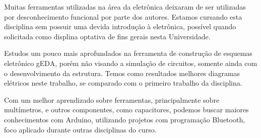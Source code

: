 \documentclass{article}
\begin{document}
Muitas ferramentas utilizadas na área da eletrônica deixaram de ser utilizadas
por desconhecimento funcional por parte dos autores. Estamos cursando esta
disciplina sem possuir uma devida introdução à eletrônica, possível quando
solicitada como displina optativa de fins gerais nesta Universidade.

Estudos um pouco mais aprofundados na ferramenta de construção de esquemas
eletrônico gEDA, porém não visando a simulação de circuitos, somente ainda com o
desenvolvimento da estrutura. Temos como resultados melhores diagramas elétricos
neste trabalho, se comparado com o primeiro trabalho da disciplina.

Com um melhor aprendizado sobre ferramentas, principalmente sobre multímetros, e
outros componentes, como capacitores, podemos buscar maiores conhecimentos com
Arduino, utilizando projetos com programação Bluetooth, foco aplicado durante
outras disciplinas do curso.
\end{document}
